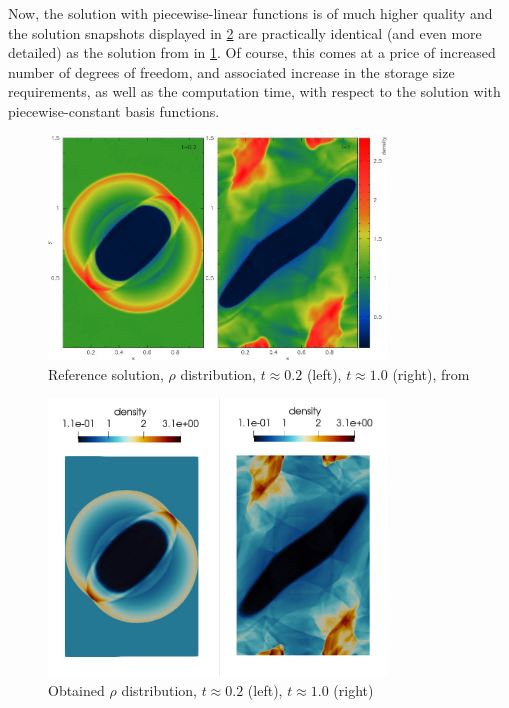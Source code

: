 Now, the solution with piecewise-linear functions is of much higher quality and the solution snapshots displayed in \cref{figure:blastFinal} are practically identical (and even more detailed) as the solution from \cite{blastNew1} in \cref{figure:blastRef}. Of course, this comes at a price of increased number of degrees of freedom, and associated increase in the storage size requirements, as well as the computation time, with respect to the solution with piecewise-constant basis functions.

\begin{figure}[H]
	\begin{center}
		\includegraphics[width=0.8\textwidth]{img/mhd-blast/new/ref.jpg}
	\caption{Reference solution, $\rho$ distribution, $t \approx 0.2$ (left), $t \approx 1.0$ (right), from \cite{blastNew1}}
	\label{figure:blastRef}
	\end{center}
\end{figure}
\vspace{-6mm}
\begin{figure}[H]
	\begin{center}
		\includegraphics[width=0.8\textwidth]{img/mhd-blast/new/ref-result.jpg}
	\caption{Obtained $\rho$ distribution, $t \approx 0.2$ (left), $t \approx 1.0$ (right)}
	\label{figure:blastFinal}
	\end{center}
\end{figure}
\vspace{-4mm}

